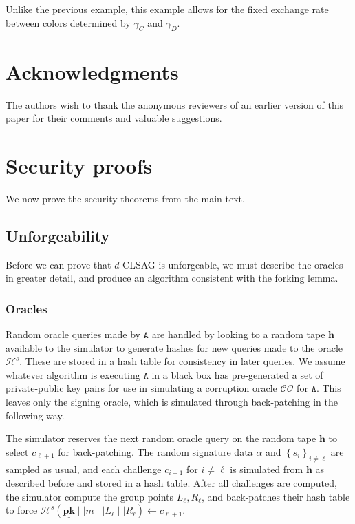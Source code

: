 \documentclass[draft]{llncs} %
\begin{document}
Unlike the previous example, this example allows for the fixed exchange rate between colors determined by $\gamma_C$ and $\gamma_D$.


\section*{Acknowledgments}
The authors wish to thank the anonymous reviewers of an earlier version of this paper for their comments and valuable suggestions.





\appendix


\section{Security proofs}\label{app:proofs}
We now prove the security theorems from the main text.

\subsection{Unforgeability}\label{app:unforgeability}
Before we can prove that $d$-CLSAG is unforgeable, we must describe the oracles in greater detail, and produce an algorithm consistent with the forking lemma.


\subsubsection{Oracles}
Random oracle queries made by $\texttt{A}$ are handled by looking to a random tape $\textbf{h}$ available to the simulator to generate hashes for new queries made to the oracle $\mathcal{H}^s$. These are stored in a hash table for consistency in later queries.  We assume whatever algorithm is executing $\texttt{A}$ in a black box has pre-generated a set of private-public key pairs for use in simulating a corruption oracle $\mathcal{CO}$ for $\texttt{A}$. This leaves only the signing oracle, which is simulated through back-patching in the following way.

The simulator reserves the next random oracle query on the random tape $\textbf{h}$ to select $c_{\ell+1}$ for back-patching. The random signature data $\alpha$ and $\left\{s_i\right\}_{i \neq \ell}$ are sampled as usual, and each challenge $c_{i+1}$ for $i \neq \ell$ is simulated from $\textbf{h}$ as described before and stored in a hash table. After all challenges are computed, the simulator compute the group points $L_\ell, R_\ell$, and back-patches their hash table to force $\mathcal{H}^s(\underline{\textbf{pk}} \mid \mid m \mid \mid L_\ell \mid \mid R_\ell) \leftarrow c_{\ell+1}$.
\end{document}
